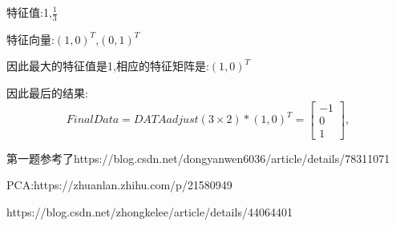 \documentclass[11pt, a4paper, UTF8]{ctexart}
\begin{document}
\begin{solution}
\begin{enumerate}
			特征值:1,$\frac{1}{3}$

			特征向量:$(1,0)^T$,$(0,1)^T$

			因此最大的特征值是1,相应的特征矩阵是:$(1,0)^T$

			因此最后的结果:
			\begin{equation}
				FinalData=DATAadjust(3\times 2)*(1,0)^T={
				\left[ \begin{array}{c}
					-1\\
					0\\
					1
				\end{array} 
				\right ]},
				\end{equation}
		
	\end{enumerate}
\end{solution}
\begin{remark}
	第一题参考了https://blog.csdn.net/dongyanwen6036/article/details/78311071 
	
	PCA:https://zhuanlan.zhihu.com/p/21580949

	https://blog.csdn.net/zhongkelee/article/details/44064401
\end{remark}






   





	
    


%
\end{document}
